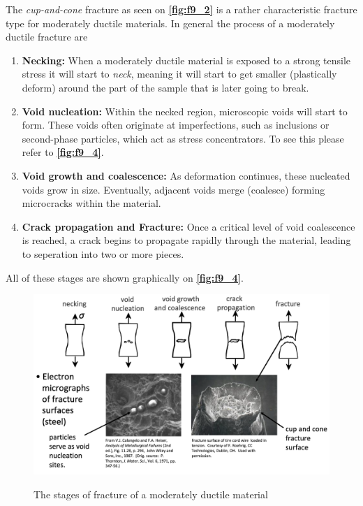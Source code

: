 The \textit{cup-and-cone} fracture as seen on \textbf{\autoref{fig:f9_2}} is a rather characteristic fracture type for moderately ductile materials. In general the process of a moderately ductile fracture are
\begin{enumerate}
  \item \textbf{Necking:} When a moderately ductile material is exposed to a strong tensile stress it will start to \textit{neck}, meaning it will start to get smaller (plastically deform) around the part of the sample that is later going to break.
  \item \textbf{Void nucleation:} Within the necked region, microscopic voids will start to form. These voids often originate at imperfections, such as inclusions or second-phase particles, which act as stress concentrators. To see this please refer to \textbf{\autoref{fig:f9_4}}. 
  \item \textbf{Void growth and coalescence:} As deformation continues, these nucleated voids grow in size. Eventually, adjacent voids merge (coalesce) forming microcracks within the material.
  \item \textbf{Crack propagation and Fracture:} Once a critical level of void coalescence is reached, a crack begins to propagate rapidly through the material, leading to seperation into two or more pieces.
\end{enumerate}
All of these stages are shown graphically on \textbf{\autoref{fig:f9_4}}.
\begin{figure} [ht]
  \centering
  \caption{The stages of fracture of a moderately ductile material}
  \includegraphics[width=0.5\linewidth]{./figures/f9_4.png}
  \label{fig:f9_4}
\end{figure}

